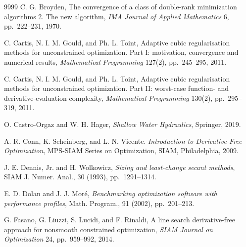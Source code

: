 \documentclass{article}
\begin{document}
\begin{thebibliography}{9999}
 C. G. Broyden, The convergence of a class of double-rank minimization
 algorithms 2. The new algorithm, {\it IMA Journal of Applied Mathematics} 6, pp.~222--231, 1970.

 C. Cartis, N. I. M. Gould, and Ph. L. Toint, Adaptive cubic regularisation
 methods for unconstrained optimization. Part I: motivation, convergence and numerical results,
 {\it Mathematical Programming} 127(2), pp.~245--295, 2011.
%

 C. Cartis, N. I. M. Gould, and Ph. L. Toint, Adaptive cubic regularisation
 methods for unconstrained optimization. Part II: worst-case function- and derivative-evaluation
 complexity, {\it Mathematical Programming} 130(2), pp.~295--319, 2011.

 O. Castro-Orgaz and W. H. Hager, {\it Shallow Water Hydraulics}, Springer, 2019. 

 A. R. Conn, K. Scheinberg, 
 and L. N. Vicente. \textit{Introduction to Derivative-Free Optimization}, MPS-SIAM Series on Optimization, SIAM, Philadelphia, 2009.



J. E. Dennis, Jr. and H. Wolkowicz, \emph{Sizing and least-change secant
	methods}, SIAM J. Numer. Anal., 30 (1993), pp.~1291--1314.


E. D. Dolan and J. J. Mor\'e, \emph{Benchmarking optimization software
	with performance profiles}, Math. Program., 91 (2002), pp.~201--213.

 G. Fasano, G. Liuzzi, S. Lucidi, and F. Rinaldi, A line search derivative-free approach for nonsmooth constrained
 optimization, {\it SIAM Journal on Optimization } 24, pp.~959--992, 2014.


\end{thebibliography}
\end{document}
